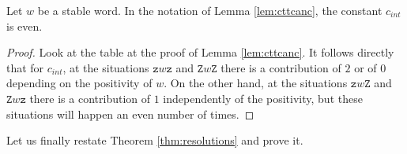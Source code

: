 \documentclass{article}
\begin{document}
	\begin{lemma}\label{lem:ceven} Let $w$ be a stable word. In the notation of Lemma \ref{lem:cttcanc}, the constant $c_{int}$ is even. 
	\end{lemma}
	\begin{proof}
		Look at the table at the proof of Lemma \ref{lem:cttcanc}. It follows directly that for $c_{int}$, at the situations $\mathtt{z}w\mathtt{z}$ and $\mathtt{Z}w\mathtt{Z}$ there is a contribution of $2$ or of $0$ depending on the positivity of $w$. On the other hand, at the situations $\mathtt{z}w\mathtt{Z}$ and $\mathtt{Z}w\mathtt{z}$ there is a contribution of $1$ independently of the positivity, but these situations will happen an even number of times.
	\end{proof}
	
	Let us finally restate Theorem \ref{thm:resolutions} and prove it.
	
	\resolutions*
	
\end{document}
